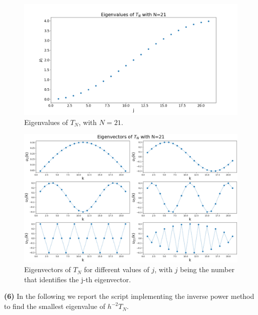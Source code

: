 \documentclass[a4paper,11pt]{article}
\begin{document}
\begin{figure}[H]
	\centering
	\includegraphics[scale=0.40]{Plot/Eigs_Tn_n=21.png}
	\caption{Eigenvalues of $T_{N}$, with $N=21$.}
	\label{Fig:Eigs_Tn}
\end{figure}

\begin{figure}[H]
	\includegraphics[scale=0.43]{Plot/Eigvect_Tn_n=21.png}
	\caption{Eigenvectors of $T_{N}$ for different values of $j$, with $j$ being the number that identifies the j-th eigenvector.}
	\label{Fig:Eigvect_Tn}
\end{figure}

\noindent \textbf{(6)} In the following we report the script implementing the inverse power method to find the smallest eigenvalue of $h^{-2}T_{N}$.
\end{document}
